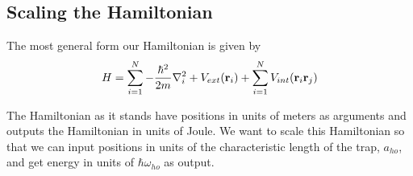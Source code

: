 \documentclass[
    a4paper, aps, twocolumn, floatfix, superscriptaddress,
    nofootinbib]{revtex4-1}
\begin{document}
\begin{appendices}
\newpage
\section{Scaling the Hamiltonian}

The most general form our Hamiltonian is given by 
\begin{equation}
    H = \sum_{i=1}^{N} -\frac{\hbar^2}{2m}\nabla_i^2 + V_{ext}(\bold{r}_i) + \sum_{i=1}^N V_{int} (\bold{r}_i \bold{r}_j) 
\end{equation}

 The Hamiltonian as it stands have positions in units of meters as arguments and outputs the Hamiltonian in units of Joule. We want to scale this Hamiltonian so that we can input positions in units of the characteristic length of the trap, $a_{ho}$, and get energy in units of $\hbar \omega_{ho}$ as output.
 

\end{appendices}
\end{document}
